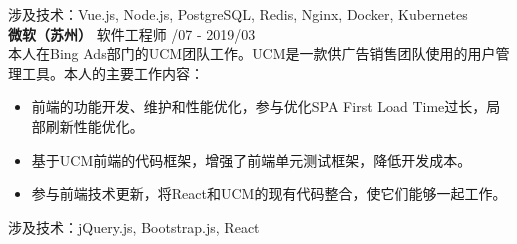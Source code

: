 \documentclass[a4paper]{article}
\newenvironment{changemargin}[2]{%
  \begin{list}{}{%
    \setlength{\topsep}{0pt}%
    \setlength{\leftmargin}{#1}%
    \setlength{\rightmargin}{#2}%
    \setlength{\listparindent}{\parindent}%
    \setlength{\itemindent}{\parindent}%
    \setlength{\parsep}{\parskip}%
  }%
  \item[]}{\end{list}
}
\newenvironment{body} {
	\vspace*{-16pt}
	\begin{changemargin}{-0.5in}{-0.5in}
  }	
	{\end{changemargin}
}
\begin{document}
\begin{body}
	\vspace{2pt}
	涉及技术：{\fontarial Vue.js, Node.js, PostgreSQL, Redis, Nginx, Docker, Kubernetes}\\

	\vspace{10pt}
	\textbf{微软（苏州）} \hfill 软件工程师 {/07 - 2019/03}\\ 
	\smallskip
	本人在{\fontarial Bing Ads}部门的{\fontarial UCM}团队工作。{\fontarial UCM}是一款供广告销售团队使用的用户管理工具。本人的主要工作内容：\\
	\vspace*{-2pt}
	\begin{itemize} \itemsep -0pt  %
		\item 前端的功能开发、维护和性能优化，参与优化{\fontarial SPA First Load Time}过长，局部刷新性能优化。\\
	\end{itemize}
	\vspace*{-10pt}
	\begin{itemize} \itemsep -0pt  %
		\item 基于{\fontarial UCM}前端的代码框架，增强了前端单元测试框架，降低开发成本。\\
	\end{itemize}
	\vspace*{-10pt}
	\begin{itemize} \itemsep -0pt  %
		\item 参与前端技术更新，将{\fontarial React}和{\fontarial UCM}的现有代码整合，使它们能够一起工作。\\
	\end{itemize}
	\vspace*{-4pt}
	涉及技术：{\fontarial jQuery.js, Bootstrap.js, React}\\


\end{body}
\end{document}
